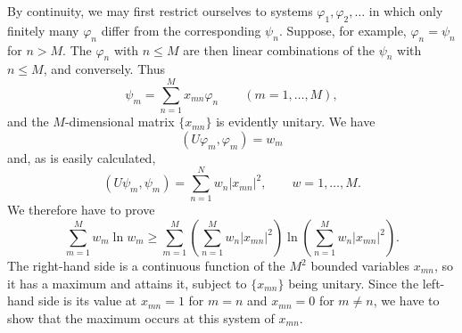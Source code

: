 \documentclass[fontsize=13pt,twoside,openany,headings=normal,parskip=false,bookmarkpackage=false,DIV=calc]{scrbook}
\begin{document}
By continuity, we may first restrict ourselves to systems $\varphi_1,\varphi_2,\ldots$ in which only finitely many $\varphi_n$ differ from the corresponding $\psi_n$. Suppose, for example, $\varphi_n=\psi_n$ for $n>M$. The $\varphi_n$ with $n\leq M$ are then linear combinations of the $\psi_n$ with $n\leq M$, and conversely. Thus
\[
\psi_m=\sum_{n=1}^Mx_{mn}\varphi_n\qquad(m=1,\ldots,M),
\]
and the $M$-dimensional matrix $\{x_{mn}\}$ is evidently unitary. We have
\[
(U\varphi_m,\varphi_m)=w_m
\]
and, as is easily calculated,
\[
(U\psi_m,\psi_m)=\sum_{n=1}^Nw_n|x_{mn}|^2,\qquad w=1,\ldots,M.
\]
We therefore have to prove
\[
\sum_{m=1}^Mw_m\ln w_m\geq
\sum_{m=1}^M\left(\sum_{n=1}^Mw_n|x_{mn}|^2\right)
\ln\left(\sum_{n=1}^Mw_n|x_{mn}|^2\right).
\]
The right-hand side is a continuous function of the $M^2$ bounded variables $x_{mn}$, so it has a maximum and attains it, subject to $\{x_{mn}\}$ being unitary. Since the left-hand side is its value at $x_{mn}=1$ for $m=n$ and $x_{mn}=0$ for $m\ne n$, we have to show that the maximum occurs at this system of $x_{mn}$.
\end{document}
